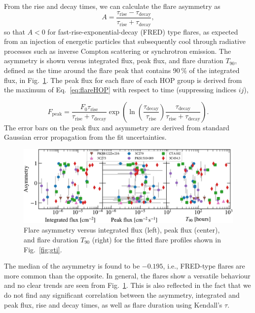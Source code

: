 \documentclass[twocolumn,linenumbers]{aastex62}
\begin{document}
From the rise and decay times, we can calculate the flare asymmetry as
\begin{equation}
    A = \frac{\tau_\mathrm{rise}-\tau_\mathrm{decay}}
    {\tau_\mathrm{rise}+\tau_\mathrm{decay}},
\end{equation}
so that $A < 0$ for fast-rise-exponential-decay (FRED) type flares, as expected from an injection of energetic particles that subsequently cool through radiative processes such as inverse Compton scattering or synchrotron emission.
The asymmetry is shown versus integrated flux, peak flux, and flare duration $T_{90}$, defined as the time around the flare peak that contains 90\,\% of the integrated flux, in Fig.~\ref{fig:asym}.
The peak flux for each flare of each HOP group is derived from the maximum of  Eq.~\ref{eq:flareHOP} with respect to time (suppressing indices $ij$),

\begin{equation}
    F_{\mathrm{peak}} = \frac{F_{0} \tau_\mathrm{rise}}{\tau_\mathrm{rise} + \tau_\mathrm{decay}}\exp\left(\ln\left(\frac{\tau_\mathrm{decay}}{\tau_\mathrm{rise}}\right)\frac{\tau_\mathrm{decay}}{\tau_\mathrm{rise} + \tau_\mathrm{decay}}\right).
\end{equation}
The error bars on the peak flux and asymmetry are derived from standard Gaussian error propagation from the fit uncertainties.

\begin{figure}
    \centering
    \includegraphics[width = .8\linewidth]{figures/lcfithop_results_asym_vs_all_orbit_maxiter2_fsys0p00_addcomp0.pdf}
    \caption{Flare asymmetry versus integrated flux (left), peak flux (center), and flare duration $T_{90}$ (right) for the fitted flare profiles shown in Fig.~\ref{fig:gti}.}
    \label{fig:asym}
\end{figure}

The median of the asymmetry is found to be $-0.195$, i.e., FRED-type flares are more common than the opposite. In general, the flares show a versatile behaviour and no clear trends are seen from Fig.~\ref{fig:asym}. This is also reflected in the fact that we do not find any significant correlation between the asymmetry, integrated and peak flux, rise and decay times, as well as flare duration using Kendall's $\tau$.
\end{document}
